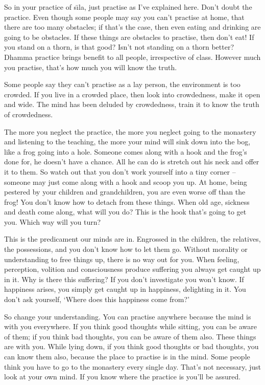 So in your practice of s\={\i}la, just practise as I've explained here. Don't doubt the practice. Even though some people may say you can't practise at home, that there are too many obstacles; if that's the case, then even eating and drinking are going to be obstacles. If these things are obstacles to practise, then don't eat! If you stand on a thorn, is that good? Isn't not standing on a thorn better? Dhamma practice brings benefit to all people, irrespective of class. However much you practise, that's how much you will know the truth.

Some people say they can't practise as a lay person, the environment is too crowded. If you live in a crowded place, then look into crowdedness, make it open and wide. The mind has been deluded by crowdedness, train it to know the truth of crowdedness.

The more you neglect the practice, the more you neglect going to the monastery and listening to the teaching, the more your mind will sink down into the bog, like a frog going into a hole. Someone comes along with a hook and the frog's done for, he doesn't have a chance. All he can do is stretch out his neck and offer it to them. So watch out that you don't work yourself into a tiny corner -- someone may just come along with a hook and scoop you up. At home, being pestered by your children and grandchildren, you are even worse off than the frog! You don't know how to detach from these things. When old age, sickness and death come along, what will you do? This is the hook that's going to get you. Which way will you turn?

This is the predicament our minds are in. Engrossed in the children, the relatives, the possessions, and you don't know how to let them go. Without morality or understanding to free things up, there is no way out for you. When feeling, perception, volition and consciousness produce suffering you always get caught up in it. Why is there this suffering? If you don't investigate you won't know. If happiness arises, you simply get caught up in happiness, delighting in it. You don't ask yourself, `Where does this happiness come from?'

So change your understanding. You can practise anywhere because the mind is with you everywhere. If you think good thoughts while sitting, you can be aware of them; if you think bad thoughts, you can be aware of them also. These things are with you. While lying down, if you think good thoughts or bad thoughts, you can know them also, because the place to practise is in the mind. Some people think you have to go to the monastery every single day. That's not necessary, just look at your own mind. If you know where the practice is you'll be assured.

